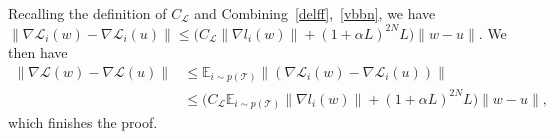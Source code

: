 \documentclass{osudissert96}
\begin{document}
	Recalling the definition of $C_\mathcal{L}$ and 
	 Combining~\cref{delff},~\cref{vbbn}, we have 
	$\|\nabla \mathcal{L}_i(w) - \nabla \mathcal{L}_i(u)\| \leq \big( C_\mathcal{L} \|\nabla l_i(w)\| + (1+\alpha L)^{2N}L  \big) \|w-u\|.$ 
	We then have
	\begin{align*}
	\|\nabla \mathcal{L}(w) - \nabla \mathcal{L}(u)\| &\leq  \mathbb{E}_{i\sim p(\mathcal{T})}\|(\nabla \mathcal{L}_i(w) - \nabla \mathcal{L}_i(u))\|
	\\&\leq  \big( C_\mathcal{L}  \mathbb{E}_{i\sim p(\mathcal{T})}\|\nabla l_i(w)\| + (1+\alpha L)^{2N}L  \big) \|w-u\|,
	\end{align*}
	which finishes the proof. 

\end{document}
